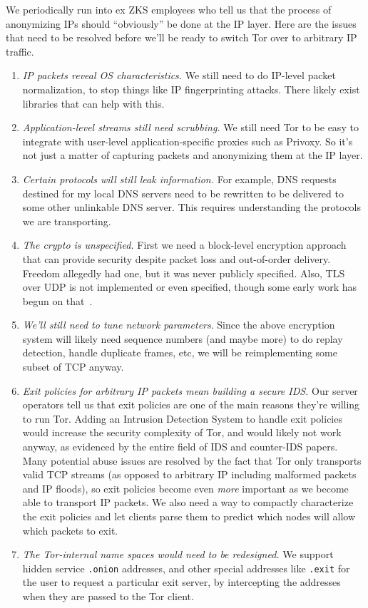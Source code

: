 \documentclass{llncs}
\begin{document}
We periodically run into ex ZKS employees who tell us that the process of
anonymizing IPs should ``obviously'' be done at the IP layer. Here are
the issues that need to be resolved before we'll be ready to switch Tor
over to arbitrary IP traffic.

\begin{enumerate}
\setlength{\itemsep}{0mm}
\setlength{\parsep}{0mm}
\item \emph{IP packets reveal OS characteristics.} We still need to do
IP-level packet normalization, to stop things like IP fingerprinting
attacks. There likely exist libraries that can help with this.
\item \emph{Application-level streams still need scrubbing.} We still need
Tor to be easy to integrate with user-level application-specific proxies
such as Privoxy. So it's not just a matter of capturing packets and
anonymizing them at the IP layer.
\item \emph{Certain protocols will still leak information.} For example,
DNS requests destined for my local DNS servers need to be rewritten
to be delivered to some other unlinkable DNS server. This requires
understanding the protocols we are transporting.
\item \emph{The crypto is unspecified.} First we need a block-level encryption
approach that can provide security despite
packet loss and out-of-order delivery. Freedom allegedly had one, but it was
never publicly specified. %
Also, TLS over UDP is not implemented or even
specified, though some early work has begun on that~\cite{dtls}.
\item \emph{We'll still need to tune network parameters}. Since the above
encryption system will likely need sequence numbers (and maybe more) to do
replay detection, handle duplicate frames, etc, we will be reimplementing
some subset of TCP anyway.
\item \emph{Exit policies for arbitrary IP packets mean building a secure
IDS.}  Our server operators tell us that exit policies are one of
the main reasons they're willing to run Tor.
Adding an Intrusion Detection System to handle exit policies would
increase the security complexity of Tor, and would likely not work anyway,
as evidenced by the entire field of IDS and counter-IDS papers. Many
potential abuse issues are resolved by the fact that Tor only transports
valid TCP streams (as opposed to arbitrary IP including malformed packets
and IP floods), so exit policies become even \emph{more} important as
we become able to transport IP packets. We also need a way to compactly
characterize the exit policies and let clients parse them to predict
which nodes will allow which packets to exit.
\item \emph{The Tor-internal name spaces would need to be redesigned.} We
support hidden service {\tt{.onion}} addresses, and other special addresses
like {\tt{.exit}} for the user to request a particular exit server,
by intercepting the addresses when they are passed to the Tor client.
\end{enumerate}
\end{document}
